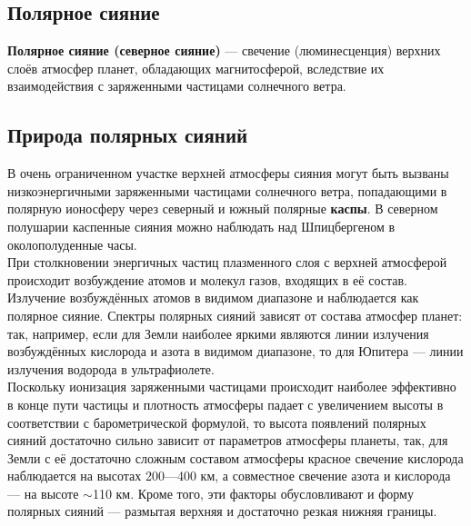 \documentclass[a4paper,14pt]{article}
\begin{document}
\setcounter{secnumdepth}{0} %

\setcounter{tocdepth}{0}    %

\subsection{Полярное сияние}
\textbf{Полярное сияние (северное сияние)} — свечение (люминесценция) верхних слоёв атмосфер планет, обладающих магнитосферой, 
вследствие их взаимодействия с заряженными частицами солнечного ветра.

\setcounter{tocdepth}{3}    %

\tableofcontents

\subsection{Природа полярных сияний}
В очень ограниченном участке верхней атмосферы сияния могут быть вызваны низкоэнергичными заряженными частицами 
солнечного ветра, попадающими в полярную ионосферу через северный и южный полярные \textbf{каспы}. В северном полушарии 
каспенные сияния можно наблюдать над Шпицбергеном в околополуденные часы. \\
\indent При столкновении энергичных частиц плазменного слоя с верхней атмосферой происходит возбуждение атомов и молекул газов,
входящих в её состав. Излучение возбуждённых атомов в видимом диапазоне и наблюдается как полярное сияние. Спектры 
полярных сияний зависят от состава атмосфер планет: так, например, если для Земли наиболее яркими являются линии излучения 
возбуждённых кислорода и азота в видимом диапазоне, то для Юпитера — линии излучения водорода в ультрафиолете. \\
\indent Поскольку ионизация заряженными частицами происходит наиболее эффективно в конце пути частицы и плотность атмосферы
падает с увеличением высоты в соответствии с барометрической формулой, то высота появлений полярных сияний достаточно
сильно зависит от параметров атмосферы планеты, так, для Земли с её достаточно сложным составом атмосферы красное
свечение кислорода наблюдается на высотах 200—400 км, а совместное свечение азота и кислорода — на высоте $\sim$110 км.
Кроме того, эти факторы обусловливают и форму полярных сияний — размытая верхняя и достаточно резкая нижняя границы.
\end{document}
